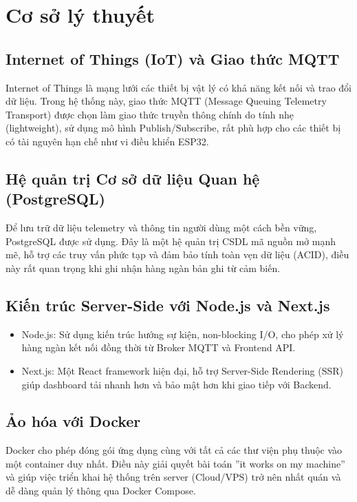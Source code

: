 \newpage
\section{Cơ sở lý thuyết}

\subsection{Internet of Things (IoT) và Giao thức MQTT}
Internet of Things là mạng lưới các thiết bị vật lý có khả năng kết nối và trao đổi dữ liệu. Trong hệ thống này, giao thức MQTT (Message Queuing Telemetry Transport) được chọn làm giao thức truyền thông chính do tính nhẹ (lightweight), sử dụng mô hình Publish/Subscribe, rất phù hợp cho các thiết bị có tài nguyên hạn chế như vi điều khiển ESP32.

\subsection{Hệ quản trị Cơ sở dữ liệu Quan hệ (PostgreSQL)}
Để lưu trữ dữ liệu telemetry và thông tin người dùng một cách bền vững, PostgreSQL được sử dụng. Đây là một hệ quản trị CSDL mã nguồn mở mạnh mẽ, hỗ trợ các truy vấn phức tạp và đảm bảo tính toàn vẹn dữ liệu (ACID), điều này rất quan trọng khi ghi nhận hàng ngàn bản ghi từ cảm biến.

\subsection{Kiến trúc Server-Side với Node.js và Next.js}
\begin{itemize}
    \item Node.js: Sử dụng kiến trúc hướng sự kiện, non-blocking I/O, cho phép xử lý hàng ngàn kết nối đồng thời từ Broker MQTT và Frontend API.
    \item Next.js: Một React framework hiện đại, hỗ trợ Server-Side Rendering (SSR) giúp dashboard tải nhanh hơn và bảo mật hơn khi giao tiếp với Backend.
\end{itemize}

\subsection{Ảo hóa với Docker}
Docker cho phép đóng gói ứng dụng cùng với tất cả các thư viện phụ thuộc vào một container duy nhất. Điều này giải quyết bài toán ”it works on my machine” và giúp việc triển khai hệ thống trên server (Cloud/VPS) trở nên nhất quán và dễ dàng quản lý thông qua Docker Compose.
